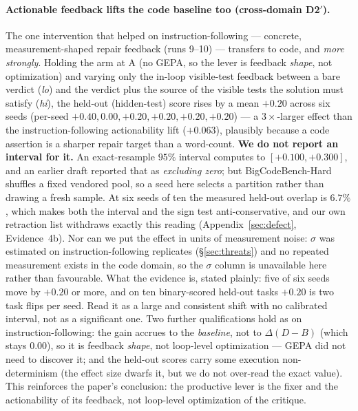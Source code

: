 \documentclass[11pt]{article}
\newcommand{\dd}{\ensuremath{\Delta}}
\begin{document}
\paragraph{Actionable feedback lifts the code baseline too (cross-domain D2$'$).} The one
intervention that helped on instruction-following --- concrete, measurement-shaped repair
feedback (runs 9--10) --- transfers to code, and \emph{more strongly}. Holding the arm at A
(no GEPA, so the lever is feedback \emph{shape}, not optimization) and varying only the in-loop
visible-test feedback between a bare verdict (\emph{lo}) and the verdict plus the source of the
visible tests the solution must satisfy (\emph{hi}), the held-out (hidden-test) score rises by
a mean $+0.20$ across six seeds (per-seed $+0.40, 0.00, +0.20, +0.20, +0.20, +0.20$) --- a
$3\times$-larger effect than the instruction-following actionability lift ($+0.063$), plausibly
because a code assertion is a sharper repair target than a word-count. \textbf{We do not report
an interval for it.} An exact-resample $95\%$ interval computes to $[+0.100, +0.300]$, and an
earlier draft reported that as \emph{excluding zero}; but BigCodeBench-Hard shuffles a fixed
vendored pool, so a seed here selects a partition rather than drawing a fresh sample. At six
seeds of ten the measured held-out overlap is $6.7\%$, which makes both the interval and the
sign test anti-conservative, and our own retraction list withdraws exactly this reading
(Appendix~\ref{sec:defect}, Evidence~4b). Nor can we put the effect in units of measurement
noise: $\sigma$ was estimated on instruction-following replicates
(\S\ref{sec:threats}) and no repeated measurement exists in the code domain, so the $\sigma$
column is unavailable here rather than favourable. What the evidence is, stated plainly: five of
six seeds move by $+0.20$ or more, and on ten binary-scored held-out tasks $+0.20$ is two task
flips per seed. Read it as a large and consistent shift with no calibrated interval, not as a
significant one. Two further qualifications hold as on instruction-following: the gain accrues to
the \emph{baseline}, not to $\dd(D-B)$ (which stays $0.00$), so it is feedback \emph{shape}, not
loop-level optimization --- GEPA did not need to discover it; and the held-out scores carry some
execution non-determinism (the effect size dwarfs it, but we do not over-read the exact value). This reinforces the paper's conclusion:
the productive lever is the fixer and the actionability of its feedback, not loop-level
optimization of the critique.
\end{document}
